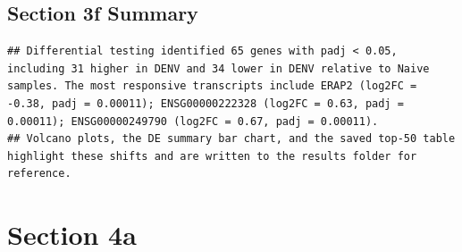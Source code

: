 \documentclass[
]{article}
\begin{document}
\subsection{Section 3f Summary}\label{section-3f-summary}

\begin{verbatim}
## Differential testing identified 65 genes with padj < 0.05, including 31 higher in DENV and 34 lower in DENV relative to Naive samples. The most responsive transcripts include ERAP2 (log2FC = -0.38, padj = 0.00011); ENSG00000222328 (log2FC = 0.63, padj = 0.00011); ENSG00000249790 (log2FC = 0.67, padj = 0.00011).
## Volcano plots, the DE summary bar chart, and the saved top-50 table highlight these shifts and are written to the results folder for reference.
\end{verbatim}

\section{Section 4a}\label{section-4a}
\end{document}

